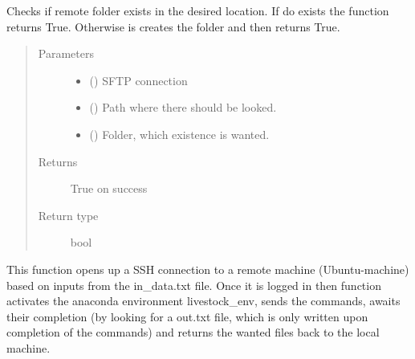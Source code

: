 \documentclass[letterpaper,10pt,english]{sphinxmanual}
\begin{document}
\begin{fulllineitems}
\label{\detokenize{ssh:livestock.ssh.check_for_remote_folder}}
Checks if remote folder exists in the desired location. If do exists the function returns True.
Otherwise is creates the folder and then returns True.
\begin{quote}\begin{description}
\item[{Parameters}] \leavevmode\begin{itemize}
\item {} 
 (\sphinxstyleliteralemphasis{(}\sphinxstyleliteralemphasis{)}\sphinxstyleliteralemphasis{(}\sphinxstyleliteralemphasis{)}) \textendash{} SFTP connection

\item {} 
 () \textendash{} Path where there should be looked.

\item {} 
 () \textendash{} Folder, which existence is wanted.

\end{itemize}

\item[{Returns}] \leavevmode
True on success

\item[{Return type}] \leavevmode
bool

\end{description}\end{quote}

\end{fulllineitems}


\begin{fulllineitems}
\label{\detokenize{ssh:livestock.ssh.ssh_connection}}
This function opens up a SSH connection to a remote machine (Ubuntu-machine) based on inputs from the in\_data.txt
file. Once it is logged in then function activates the anaconda environment livestock\_env, sends the commands,
awaits their completion (by looking for a out.txt file, which is only written upon completion of the commands)
and returns the wanted files back to the local machine.

\end{fulllineitems}
\end{document}
